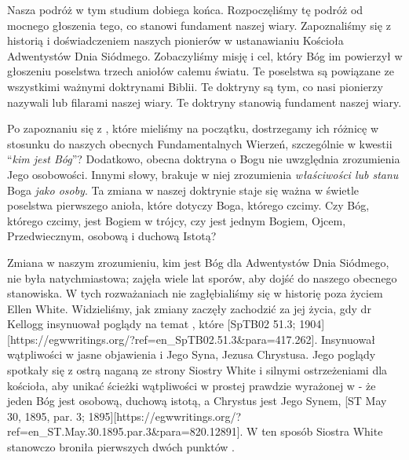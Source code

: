 
Nasza podróż w tym studium dobiega końca. Rozpoczęliśmy tę podróż od mocnego głoszenia tego, co stanowi fundament naszej wiary. Zapoznaliśmy się z historią i doświadczeniem naszych pionierów w ustanawianiu Kościoła Adwentystów Dnia Siódmego. Zobaczyliśmy misję i cel, który Bóg im powierzył w głoszeniu poselstwa trzech aniołów całemu światu. Te poselstwa są powiązane ze wszystkimi ważnymi doktrynami Biblii. Te doktryny są tym, co nasi pionierzy nazywali  lub filarami naszej wiary. Te doktryny stanowią fundament naszej wiary.

Po zapoznaniu się z , które mieliśmy na początku, dostrzegamy ich różnicę w stosunku do naszych obecnych Fundamentalnych Wierzeń, szczególnie w kwestii “\textit{kim jest Bóg}”? Dodatkowo, obecna doktryna o Bogu nie uwzględnia zrozumienia Jego osobowości. Innymi słowy, brakuje w niej zrozumienia \textit{właściwości lub stanu} Boga \textit{jako osoby}. Ta zmiana w naszej doktrynie staje się ważna w świetle poselstwa pierwszego anioła, które dotyczy Boga, którego czcimy. Czy Bóg, którego czcimy, jest Bogiem w trójcy, czy jest jednym Bogiem, Ojcem, Przedwiecznym, osobową i duchową Istotą?

Zmiana w naszym zrozumieniu, kim jest Bóg dla Adwentystów Dnia Siódmego, nie była natychmiastowa; zajęła wiele lat sporów, aby dojść do naszego obecnego stanowiska. W tych rozważaniach nie zagłębialiśmy się w historię poza życiem Ellen White. Widzieliśmy, jak zmiany zaczęły zachodzić za jej życia, gdy dr Kellogg insynuował poglądy na temat , które [SpTB02 51.3; 1904][https://egwwritings.org/?ref=en\_SpTB02.51.3&para=417.262]. Insynuował wątpliwości w jasne objawienia  i Jego Syna, Jezusa Chrystusa. Jego poglądy spotkały się z ostrą naganą ze strony Siostry White i silnymi ostrzeżeniami dla kościoła, aby unikać ścieżki wątpliwości w prostej prawdzie wyrażonej w  - że jeden Bóg jest osobową, duchową istotą, a Chrystus jest Jego Synem, [ST May 30, 1895, par. 3; 1895][https://egwwritings.org/?ref=en\_ST.May.30.1895.par.3&para=820.12891]. W ten sposób Siostra White stanowczo broniła pierwszych dwóch punktów .

